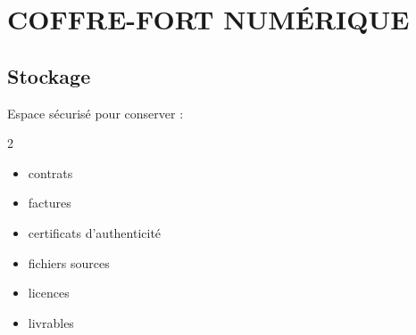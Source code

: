 \documentclass[12pt,a4paper,oneside]{book}
\begin{document}
\chapter{COFFRE-FORT NUMÉRIQUE}

\section{Stockage}
Espace sécurisé pour conserver :
\begin{multicols}{2}
\begin{itemize}
\item contrats
\item factures
\item certificats d'authenticité
\item fichiers sources
\item licences
\item livrables
\end{itemize}
\end{multicols}

\appendix
\end{document}
